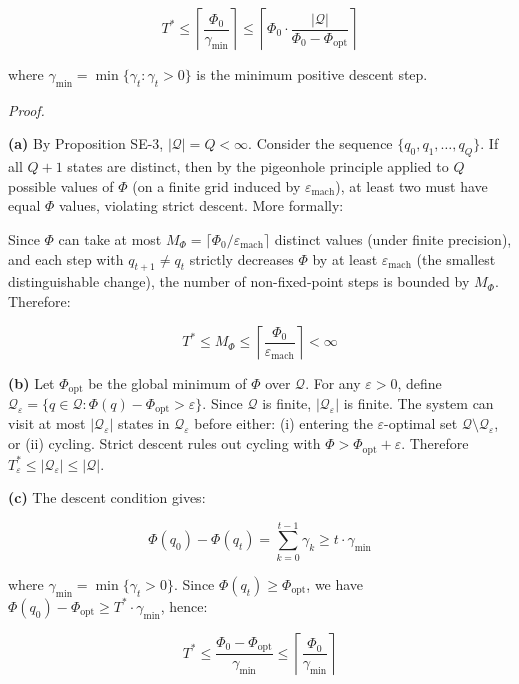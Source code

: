 \documentclass[
  12pt,
]{ctexart}
\begin{document}
\[T^* \leq \left\lceil \frac{\Phi_0}{\gamma_{\min}} \right\rceil \leq \left\lceil \Phi_0 \cdot \frac{|\mathcal{Q}|}{\Phi_0 - \Phi_{\text{opt}}} \right\rceil\]

where \(\gamma_{\min} = \min\{\gamma_t : \gamma_t > 0\}\) is the minimum
positive descent step.

\emph{Proof.}

\textbf{(a)} By Proposition SE-3, \(|\mathcal{Q}| = Q < \infty\).
Consider the sequence \(\{q_0, q_1, \ldots, q_Q\}\). If all \(Q+1\)
states are distinct, then by the pigeonhole principle applied to \(Q\)
possible values of \(\Phi\) (on a finite grid induced by
\(\varepsilon_{\text{mach}}\)), at least two must have equal \(\Phi\)
values, violating strict descent. More formally:

Since \(\Phi\) can take at most
\(M_\Phi = \lceil \Phi_0/\varepsilon_{\text{mach}} \rceil\) distinct
values (under finite precision), and each step with \(q_{t+1} \neq q_t\)
strictly decreases \(\Phi\) by at least \(\varepsilon_{\text{mach}}\)
(the smallest distinguishable change), the number of non-fixed-point
steps is bounded by \(M_\Phi\). Therefore:

\[T^* \leq M_\Phi \leq \left\lceil \frac{\Phi_0}{\varepsilon_{\text{mach}}} \right\rceil < \infty\]

\textbf{(b)} Let \(\Phi_{\text{opt}}\) be the global minimum of \(\Phi\)
over \(\mathcal{Q}\). For any \(\varepsilon > 0\), define
\(\mathcal{Q}_\varepsilon = \{q \in \mathcal{Q} : \Phi(q) - \Phi_{\text{opt}} > \varepsilon\}\).
Since \(\mathcal{Q}\) is finite, \(|\mathcal{Q}_\varepsilon|\) is
finite. The system can visit at most \(|\mathcal{Q}_\varepsilon|\)
states in \(\mathcal{Q}_\varepsilon\) before either: (i) entering the
\(\varepsilon\)-optimal set
\(\mathcal{Q} \setminus \mathcal{Q}_\varepsilon\), or (ii) cycling.
Strict descent rules out cycling with
\(\Phi > \Phi_{\text{opt}} + \varepsilon\). Therefore
\(T_\varepsilon^* \leq |\mathcal{Q}_\varepsilon| \leq |\mathcal{Q}|\).

\textbf{(c)} The descent condition gives:

\[\Phi(q_0) - \Phi(q_t) = \sum_{k=0}^{t-1} \gamma_k \geq t \cdot \gamma_{\min}\]

where \(\gamma_{\min} = \min\{\gamma_t > 0\}\). Since
\(\Phi(q_t) \geq \Phi_{\text{opt}}\), we have
\(\Phi(q_0) - \Phi_{\text{opt}} \geq T^* \cdot \gamma_{\min}\), hence:

\[T^* \leq \frac{\Phi_0 - \Phi_{\text{opt}}}{\gamma_{\min}} \leq \left\lceil \frac{\Phi_0}{\gamma_{\min}} \right\rceil\]
\end{document}
